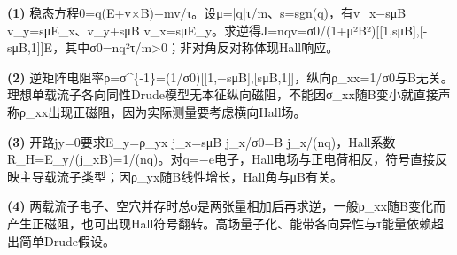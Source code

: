 \par\noindent\textbf{(1)} 稳态方程0=q(E+v×B)−mv/τ。设μ=|q|τ/m、s=sgn(q)，有v\_x−sμB v\_y=sμE\_x、v\_y+sμB v\_x=sμE\_y。求逆得J=nqv=σ0/(1+μ²B²)[[1,sμB],[-sμB,1]]E，其中σ0=nq²τ/m>0；非对角反对称体现Hall响应。
\par\noindent\textbf{(2)} 逆矩阵电阻率ρ=σ\textasciicircum{}\{-1\}=(1/σ0)[[1,−sμB],[sμB,1]]，纵向ρ\_xx=1/σ0与B无关。理想单载流子各向同性Drude模型无本征纵向磁阻，不能因σ\_xx随B变小就直接声称ρ\_xx出现正磁阻，因为实际测量要考虑横向Hall场。
\par\noindent\textbf{(3)} 开路jy=0要求E\_y=ρ\_yx j\_x=sμB j\_x/σ0=B j\_x/(nq)，Hall系数R\_H=E\_y/(j\_xB)=1/(nq)。对q=−e电子，Hall电场与正电荷相反，符号直接反映主导载流子类型；因ρ\_yx随B线性增长，Hall角与μB有关。
\par\noindent\textbf{(4)} 两载流子电子、空穴并存时总σ是两张量相加后再求逆，一般ρ\_xx随B变化而产生正磁阻，也可出现Hall符号翻转。高场量子化、能带各向异性与τ能量依赖超出简单Drude假设。
